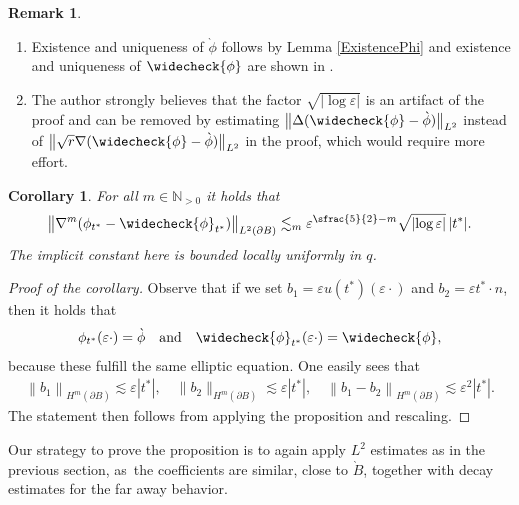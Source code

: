 \documentclass[10pt]{amsart}
\let\epsilon\varepsilon
\newtheorem{corollary}[theorem]{Corollary}
\theoremstyle{definition}
\newtheorem{remark}[theorem]{Remark}
\newcommand\N{\mathbb{N}}
\newcommand\norm[1]{\left\lVert #1\right\rVert}
\newcommand\anorm[1]{\lVert #1\rVert}
\newcommand\bnorm[1]{\bigl\lVert #1\bigr\rVert}
\newcommand\eq{=}
\let\chek\widecheck
\let\de\partial
\let\eps\epsilon
\begin{document}
\skpt
\begin{remark}
\begin{enumerate}
\item
Existence and uniqueness of $\grave{\phi}$ follows by Lemma \ref{ExistencePhi} and existence and uniqueness of $\chek{\phi}$ are shown in \cite[Th.\,3.1]{Amrouche}.
\item
The author strongly believes that the factor $\sqrt{|{\log\eps}|}$ is an artifact of the proof and can be removed by estimating $\bnorm{\Delta(\chek{\phi}-\grave{\phi})}_{L^2}$ instead of $\bnorm{\sqrt{r}\nabla(\chek{\phi}-\grave{\phi})}_{L^2}$ in the proof, which would require more effort.
\end{enumerate}
\end{remark}

\begin{corollary}\label{Potential1}
For all $m\in \N_{>0}$ it holds that\vspace*{-3pt}
\begin{align*}
\bnorm{\nabla^m(\phi_{t^*}-\chek{\phi}_{t^*})}_{L^2(\de B)}\lesssim_m \eps^{\sfrac{5}{2}-m}\sqrt{|{\log\eps}|}\,|t^*|.
\end{align*}
The implicit constant here is bounded locally uniformly in $q$.
\end{corollary}
\begin{proof}[Proof of the corollary]
Observe that if we set $b_1=\eps u(t^*)(\eps\cdot)$ and $b_2=\eps t^*\cdot n$, then it holds that\vspace*{-8pt}
\begin{align*}
\phi_{t^*}(\eps\cdot)\eq\grave{\phi}\quad\text{and}\quad \chek{\phi}_{t^*}(\eps\cdot)\eq \chek{\phi},
\end{align*}
because these fulfill the same elliptic equation. One easily sees that\vspace*{-3pt}
\begin{align*}
\norm{b_1}_{H^m(\de B)}\lesssim  \eps|t^*|,\quad \anorm{b_2}_{H^m(\de B)}\lesssim  \eps|t^*|,\quad \norm{b_1-b_2}_{H^m(\de B)}\lesssim  \eps^2|t^*|.
\end{align*}
The statement then follows from applying the proposition and rescaling.\end{proof}

Our strategy to prove the proposition is to again apply $L^2$ estimates as in the previous section, as~the coefficients are similar, close to $\grave{B}$, together with decay estimates for the far away behavior.
\end{document}
